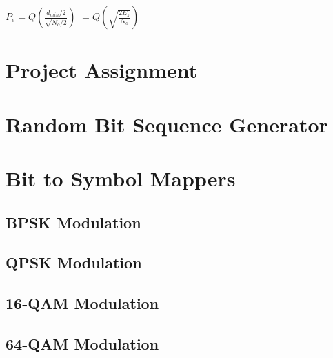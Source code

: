 \documentclass[]{article}
\begin{document}
$ P_e = Q(\frac{d_{min}/2}{\sqrt{N_o/2}}) $
$       = Q(\sqrt{\frac{2E_s}{N_o}}) $ 


\appendix
\newpage
\section{Project Assignment}
\label{app:assign}

\cleardoublepage
\newpage


\section{Random Bit Sequence Generator}
\label{app:random_bit_generator}

\cleardoublepage
\newpage

\section{Bit to Symbol Mappers}
\label{app:bittosym}
\subsection{BPSK Modulation }
\label{app:bpsk_mod}
%


\cleardoublepage  %
\newpage

\subsection{QPSK Modulation}
\label{app:qpsk_mod}

\cleardoublepage  %
\newpage

\subsection{16-QAM Modulation}
\label{app:qam_16_mod}


\cleardoublepage  %
\newpage

\subsection{64-QAM Modulation }
\label{app:qam_64_mod}

\cleardoublepage  %
\newpage
\end{document}
